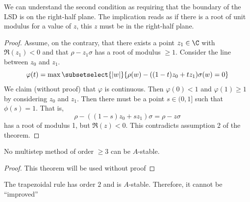 \documentclass[../Main.tex]{subfiles}
\begin{document}
\begin{remark}
    We can understand the second condition as requiring that the boundary of the LSD is on the right-half plane. The implication reads as if there is a root of unit modulus for a value of $z$, this $z$ must be in the right-half plane.
\end{remark}
\begin{proof}
    Assume, on the contrary, that there exists a point $z_1 \in \C$ with $\Re(z_1) < 0$ and that $\rho - z_1 \sigma$ has a root of modulus $\geq 1$. Consider the line between $z_0$ and $z_1$. 
    \begin{equation*}
        \varphi(t) = \max\subsetselect{|w|}{\rho(w) - ((1 - t)z_0 + tz_1)\sigma(w) = 0}
    \end{equation*}
    We claim (without proof) that $\varphi$ is continuous. Then $\varphi(0) < 1$ and $\varphi(1) \geq 1$ by considering $z_0$ and $z_1$. Then there must be a point $s \in (0, 1]$ such that $\phi(s) = 1$. That is,
    \begin{equation*}
        \rho - ((1 - s)z_0 + sz_1) \sigma = \rho - z\sigma
    \end{equation*}
    has a root of modulus 1, but $\Re(z) < 0$. This contradicts assumption 2 of the theorem.
\end{proof}
\begin{theorem}
    No multistep method of order $\geq 3$ can be $A$-stable.
    \label{thmDahlquistBarrier}
\end{theorem}
\begin{proof}
    This theorem will be used without proof
\end{proof}
\begin{example}
    The trapezoidal rule has order $2$ and is $A$-stable. Therefore, it cannot be ``improved''
\end{example}
\end{document}
